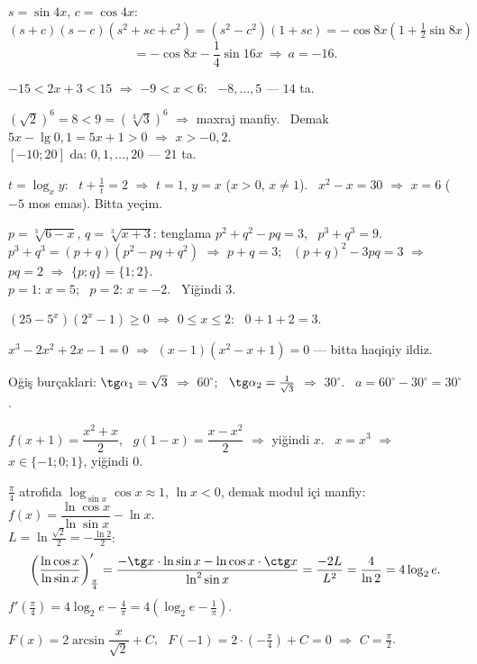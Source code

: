 $s=\sin4x$, $c=\cos4x$: \ $(s+c)(s-c)\left(s^2+sc+c^2\right)=\left(s^2-c^2\right)(1+sc)=-\cos8x\left(1+\frac12\sin8x\right)$
\[=-\cos8x-\frac14\sin16x\ \Rightarrow\ a=-16.\]

$-15<2x+3<15$ $\Rightarrow$ $-9<x<6$: \ $-8,\dots,5$ — $14$ ta.

$\left(\sqrt2\right)^6=8<9=\left(\sqrt[3]3\right)^6$ $\Rightarrow$ maxraj manfiy. \ Demak $5x-\lg0{,}1=5x+1>0$ $\Rightarrow$ $x>-0{,}2$.\\
$[-10;20]$ da: $0,1,\dots,20$ — $21$ ta.

$t=\log_xy$: \ $t+\frac1t=2$ $\Rightarrow$ $t=1$, $y=x$ ($x>0$, $x\ne1$). \ $x^2-x=30$ $\Rightarrow$ $x=6$ ($-5$ mos emas). Bitta yeçim.

$p=\sqrt[3]{6-x}$, $q=\sqrt[3]{x+3}$: tenglama $p^2+q^2-pq=3$, \ $p^3+q^3=9$.\\
$p^3+q^3=(p+q)\left(p^2-pq+q^2\right)$ $\Rightarrow$ $p+q=3$; \ $(p+q)^2-3pq=3$ $\Rightarrow$ $pq=2$ $\Rightarrow$ $\{p;q\}=\{1;2\}$.\\
$p=1$: $x=5$; \ $p=2$: $x=-2$. \ Yiğindi $3$.

$\left(25-5^x\right)\left(2^x-1\right)\ge0$ $\Rightarrow$ $0\le x\le2$: \ $0+1+2=3$.

$x^3-2x^2+2x-1=0$ $\Rightarrow$ $(x-1)\left(x^2-x+1\right)=0$ — bitta haqiqiy ildiz.

Oğiş burçaklari: $\tg\alpha_1=\sqrt3$ $\Rightarrow$ $60^\circ$; \ $\tg\alpha_2=\frac1{\sqrt3}$ $\Rightarrow$ $30^\circ$. \ $a=60^\circ-30^\circ=30^\circ$.

$f(x+1)=\dfrac{x^2+x}2$, \ $g(1-x)=\dfrac{x-x^2}2$ $\Rightarrow$ yiğindi $x$. \ $x=x^3$ $\Rightarrow$ $x\in\{-1;0;1\}$, yiğindi $0$.

$\frac\pi4$ atrofida $\log_{\sin x}\cos x\approx1$, $\ln x<0$, demak modul içi manfiy: $f(x)=\dfrac{\ln\cos x}{\ln\sin x}-\ln x$.\\
$L=\ln\frac{\sqrt2}2=-\frac{\ln2}2$:
\[\left(\frac{\ln\cos x}{\ln\sin x}\right)'_{\frac\pi4}=\frac{-\tg x\cdot\ln\sin x-\ln\cos x\cdot\ctg x}{\ln^2\sin x}=\frac{-2L}{L^2}=\frac4{\ln2}=4\log_2e.\]
$f'\left(\frac\pi4\right)=4\log_2e-\frac4\pi=4\left(\log_2e-\frac1\pi\right)$.

$F(x)=2\arcsin\dfrac x{\sqrt2}+C$, \ $F(-1)=2\cdot\left(-\frac\pi4\right)+C=0$ $\Rightarrow$ $C=\frac\pi2$.

